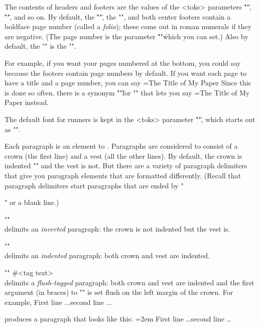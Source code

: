 The contents of headers and footers are the values of the <toks>
parameters \="\versoleftheader"\=, \="\rectoleftheader"\=, and so
on.  By default, the \="\rectorightheader"\=, the
"\versoleftheader", and both center footers contain a boldface
page number (called a {\it folio}); these come out in roman
numerals if they are negative.  (The page number is the parameter
\="\pageno"\= which you can set.)  Also by default, the
"\rectoleftheader" is the "\firstmark".

For example, if you want your pages numbered at the bottom, you
could say
\beginverb
\offheaders     %
\onfooters      %
\endverb
because the footers contain page numbers by default.  If you want
each page to have a title and a page number, you can say
\beginverb
\rectoleftheader={The Title of My Paper}
\endverb
Since this is done so often, there is a synonym
\="\runninghead"\= for "\rectoleftheader" that lets you say
\beginverb
\runninghead={The Title of My Paper}
\endverb
instead.

The default font for runners is kept in the <toks> parameter
\="\runnerfont"\=, which starts out as "\smlsize\rm".


Each paragraph is an element to \ytex.  Paragraphs are considered
to consist of a crown (the first line) and a vest (all the other
lines).  By default, the crown is indented "\parindent" and the
vest is not.  But there are a variety of paragraph delimiters
that give you paragraph elements that are formatted differently.
(Recall that paragraph delimiters start paragraphs that are
ended by "\par" or a blank line.)

\begingab

\*\+"\ivpar"\+\\delimits an {\it inverted} paragraph: the crown
is not indented but the vest is.

\*\+"\ipar"\+\\delimits an {\it indented} paragraph: both crown
and vest are indented.

\*\+"\ftpar"\+ \#{<tag text>}\\delimits a {\it flush-tagged}
paragraph: both crown and vest are indented and the first
argument (in braces) to "\ftpar" is set flush on the left margin
of the crown.  For example,
\beginverb
{} First line ...\linebreak second line ...\par
\endverb
produces a paragraph that looks like this:
\begintextlines
\parindent=2em%
First line \dots\linebreak{}second line \dots
\endtextlines

